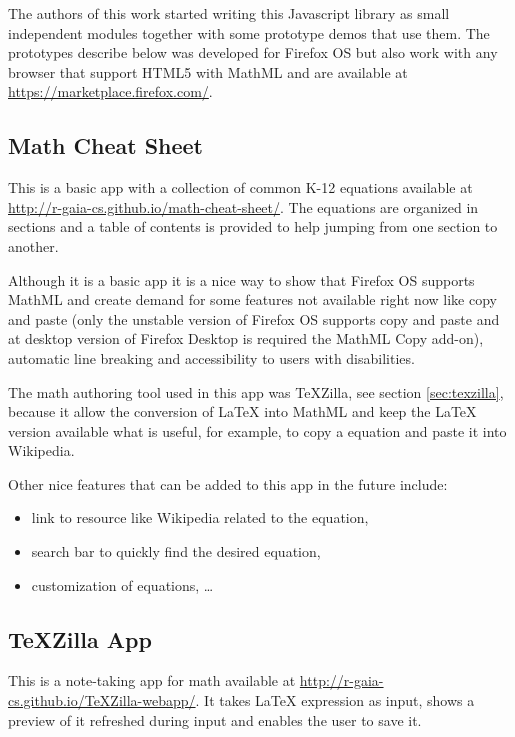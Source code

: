 The authors of this work started writing this Javascript library as small
independent modules together with some prototype demos that use them. The
prototypes describe below was developed for Firefox OS but also work with any
browser that support HTML5 with MathML and are available at \href{Firefox
Marketplace}{https://marketplace.firefox.com/}.

\subsection{Math Cheat Sheet}

This is a basic app with a collection of common K-12 equations available at
\href{http://r-gaia-cs.github.io/math-cheat-sheet/}{http://r-gaia-cs.github.io/math-cheat-sheet/}.
The equations are organized in sections and a table of contents is provided to
help jumping from one section to another.

Although it is a basic app it is a nice way to show that Firefox OS supports
MathML and create demand for some features not available right now like copy and
paste (only the unstable version of Firefox OS supports copy and paste and at
desktop version of Firefox Desktop is required the MathML Copy add-on),
automatic line breaking and accessibility to users with disabilities.

The math authoring tool used in this app was TeXZilla, see section
\ref{sec:texzilla}, because it allow the conversion of LaTeX into MathML and
keep the LaTeX version available what is useful, for example, to copy a equation
and paste it into Wikipedia.

Other nice features that can be added to this app in the future include:
\begin{itemize}
  \item link to resource like Wikipedia related to the equation,
  \item search bar to quickly find the desired equation,
  \item customization of equations, \ldots
\end{itemize}

\subsection{TeXZilla App}
\label{sec:texzillapp}

This is a note-taking app for math available at
\href{http://r-gaia-cs.github.io/TeXZilla-webapp/}{http://r-gaia-cs.github.io/TeXZilla-webapp/}.
It takes LaTeX expression as input, shows a preview of it refreshed during
input and enables the user to save it.

